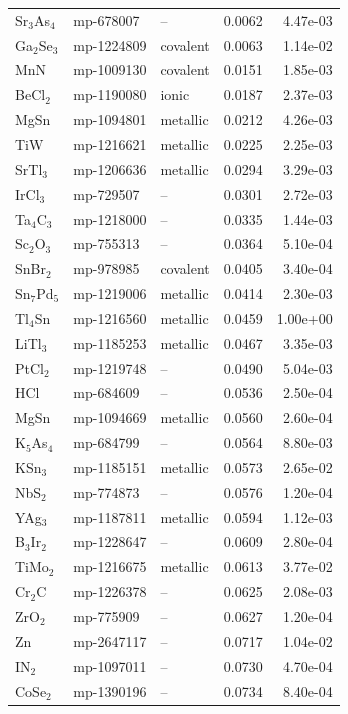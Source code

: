 \begin{longtable}{@{}l l l r r@{}}
Sr$_{3}$As$_{4}$ & mp-678007 & -- & 0.0062 & 4.47e-03 \\
Ga$_{2}$Se$_{3}$ & mp-1224809 & covalent & 0.0063 & 1.14e-02 \\
MnN & mp-1009130 & covalent & 0.0151 & 1.85e-03 \\
BeCl$_{2}$ & mp-1190080 & ionic & 0.0187 & 2.37e-03 \\
MgSn & mp-1094801 & metallic & 0.0212 & 4.26e-03 \\
TiW & mp-1216621 & metallic & 0.0225 & 2.25e-03 \\
SrTl$_{3}$ & mp-1206636 & metallic & 0.0294 & 3.29e-03 \\
IrCl$_{3}$ & mp-729507 & -- & 0.0301 & 2.72e-03 \\
Ta$_{4}$C$_{3}$ & mp-1218000 & -- & 0.0335 & 1.44e-03 \\
Sc$_{2}$O$_{3}$ & mp-755313 & -- & 0.0364 & 5.10e-04 \\
SnBr$_{2}$ & mp-978985 & covalent & 0.0405 & 3.40e-04 \\
Sn$_{7}$Pd$_{5}$ & mp-1219006 & metallic & 0.0414 & 2.30e-03 \\
Tl$_{4}$Sn & mp-1216560 & metallic & 0.0459 & 1.00e+00 \\
LiTl$_{3}$ & mp-1185253 & metallic & 0.0467 & 3.35e-03 \\
PtCl$_{2}$ & mp-1219748 & -- & 0.0490 & 5.04e-03 \\
HCl & mp-684609 & -- & 0.0536 & 2.50e-04 \\
MgSn & mp-1094669 & metallic & 0.0560 & 2.60e-04 \\
K$_{5}$As$_{4}$ & mp-684799 & -- & 0.0564 & 8.80e-03 \\
KSn$_{3}$ & mp-1185151 & metallic & 0.0573 & 2.65e-02 \\
NbS$_{2}$ & mp-774873 & -- & 0.0576 & 1.20e-04 \\
YAg$_{3}$ & mp-1187811 & metallic & 0.0594 & 1.12e-03 \\
B$_{3}$Ir$_{2}$ & mp-1228647 & -- & 0.0609 & 2.80e-04 \\
TiMo$_{2}$ & mp-1216675 & metallic & 0.0613 & 3.77e-02 \\
Cr$_{2}$C & mp-1226378 & -- & 0.0625 & 2.08e-03 \\
ZrO$_{2}$ & mp-775909 & -- & 0.0627 & 1.20e-04 \\
Zn & mp-2647117 & -- & 0.0717 & 1.04e-02 \\
IN$_{2}$ & mp-1097011 & -- & 0.0730 & 4.70e-04 \\
CoSe$_{2}$ & mp-1390196 & -- & 0.0734 & 8.40e-04 \\

\end{longtable}
